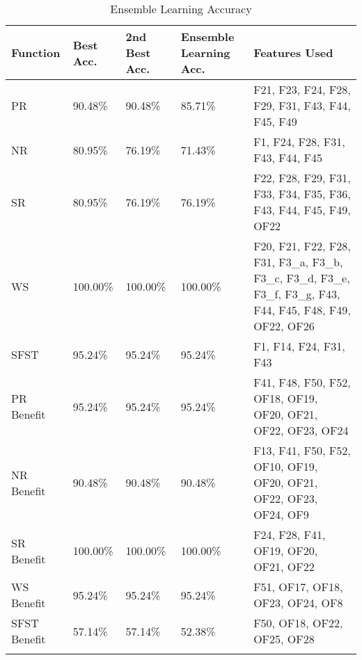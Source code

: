 \begin{longtable}{|p{2cm}|p{2cm}|p{2cm}|p{2cm}|p{6cm}|}
\hline
\textbf{Function} & \textbf{Best Acc.} & \textbf{2nd Best Acc.} & \textbf{Ensemble Learning Acc.} & \textbf{Features Used} \\ \hline
PR & 90.48\% & 90.48\% & 85.71\% & F21, F23, F24, F28, F29, F31, F43, F44, F45, F49 \\ \hline
NR & 80.95\% & 76.19\% & 71.43\% & F1, F24, F28, F31, F43, F44, F45 \\ \hline
SR & 80.95\% & 76.19\% & 76.19\% & F22, F28, F29, F31, F33, F34, F35, F36, F43, F44, F45, F49, OF22 \\ \hline
WS & 100.00\% & 100.00\% & 100.00\% & F20, F21, F22, F28, F31, F3\_a, F3\_b, F3\_c, F3\_d, F3\_e, F3\_f, F3\_g, F43, F44, F45, F48, F49, OF22, OF26 \\ \hline
SFST & 95.24\% & 95.24\% & 95.24\% & F1, F14, F24, F31, F43 \\ \hline
PR Benefit & 95.24\% & 95.24\% & 95.24\% & F41, F48, F50, F52, OF18, OF19, OF20, OF21, OF22, OF23, OF24 \\ \hline
NR Benefit & 90.48\% & 90.48\% & 90.48\% & F13, F41, F50, F52, OF10, OF19, OF20, OF21, OF22, OF23, OF24, OF9 \\ \hline
SR Benefit & 100.00\% & 100.00\% & 100.00\% & F24, F28, F41, OF19, OF20, OF21, OF22 \\ \hline
WS Benefit & 95.24\% & 95.24\% & 95.24\% & F51, OF17, OF18, OF23, OF24, OF8 \\ \hline
SFST Benefit & 57.14\% & 57.14\% & 52.38\% & F50, OF18, OF22, OF25, OF28 \\ \hline
\caption{Ensemble Learning Accuracy}
\label{tab_class_spec:featred_ensemble}
\end{longtable}
